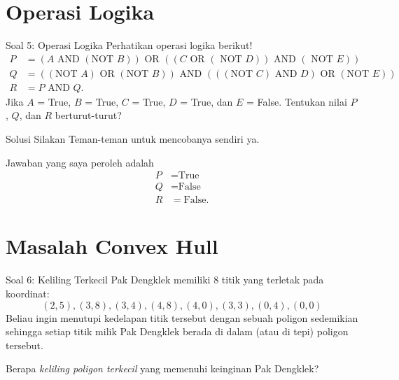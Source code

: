 \documentclass[english,t]{beamer}
\begin{document}
\section{Operasi Logika}
\begin{frame}{Soal 5: Operasi Logika}
Perhatikan operasi logika berikut!
\begin{align*}
P &= (A \text{ AND }(\text{NOT }B)) \text{ OR }((C \text{ OR }(\text{ NOT }D)) \text{ AND } (\text{ NOT }E)) \\
Q &= ((\text{NOT }A) \text{ OR }(\text{NOT }B)) \text{ AND }(((\text{NOT }C) \text{ AND }D) \text{ OR }(\text{NOT } E))  \\
R &= P \text{ AND }Q.
\end{align*}
Jika $A$ = True, $B$ = True, $C$ = True, $D$ = True, dan $E$ = False. Tentukan nilai $P$, $Q$, dan $R$ berturut-turut?
\end{frame}

\begin{frame}{Solusi}
Silakan Teman-teman untuk mencobanya sendiri ya. 

\bigskip
Jawaban yang saya peroleh adalah
\begin{align*}
P &= \text{True} \\
Q &= \text{False} \\
R &= \text{False}. 
\end{align*}
\end{frame}

\section{Masalah Convex Hull}
\begin{frame}{Soal 6: Keliling Terkecil}
Pak Dengklek memiliki 8 titik yang terletak pada koordinat:
\begin{equation*}
(2,5), (3,8), (3,4), (4,8), (4,0), (3,3), (0,4), (0,0)
\end{equation*}
Beliau ingin menutupi kedelapan titik tersebut dengan sebuah poligon sedemikian sehingga setiap titik milik Pak Dengklek berada di dalam (atau di tepi) poligon tersebut. 

\bigskip
Berapa \textit{keliling poligon terkecil} yang memenuhi keinginan Pak Dengklek?
\end{frame}
\end{document}
